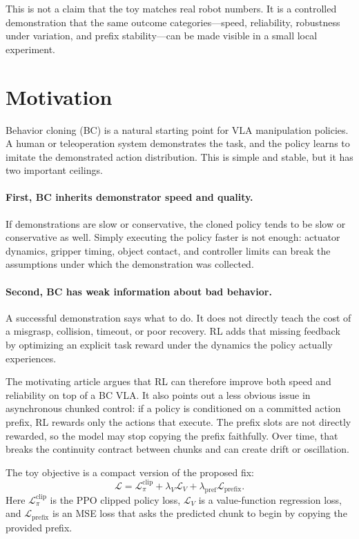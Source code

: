 \documentclass[11pt]{article}
\begin{document}
This is not a claim that the toy matches real robot numbers. It is a controlled demonstration that the same outcome categories---speed, reliability, robustness under variation, and prefix stability---can be made visible in a small local experiment.

\section{Motivation}

Behavior cloning (BC) is a natural starting point for VLA manipulation policies. A human or teleoperation system demonstrates the task, and the policy learns to imitate the demonstrated action distribution. This is simple and stable, but it has two important ceilings.

\paragraph{First, BC inherits demonstrator speed and quality.}
If demonstrations are slow or conservative, the cloned policy tends to be slow or conservative as well. Simply executing the policy faster is not enough: actuator dynamics, gripper timing, object contact, and controller limits can break the assumptions under which the demonstration was collected.

\paragraph{Second, BC has weak information about bad behavior.}
A successful demonstration says what to do. It does not directly teach the cost of a misgrasp, collision, timeout, or poor recovery. RL adds that missing feedback by optimizing an explicit task reward under the dynamics the policy actually experiences.

The motivating article argues that RL can therefore improve both speed and reliability on top of a BC VLA. It also points out a less obvious issue in asynchronous chunked control: if a policy is conditioned on a committed action prefix, RL rewards only the actions that execute. The prefix slots are not directly rewarded, so the model may stop copying the prefix faithfully. Over time, that breaks the continuity contract between chunks and can create drift or oscillation.

The toy objective is a compact version of the proposed fix:
\[
\mathcal{L}
= \mathcal{L}^{\text{clip}}_{\pi}
+ \lambda_V \mathcal{L}_V
+ \lambda_{\text{pref}} \mathcal{L}_{\text{prefix}}.
\]
Here \(\mathcal{L}^{\text{clip}}_{\pi}\) is the PPO clipped policy loss, \(\mathcal{L}_V\) is a value-function regression loss, and \(\mathcal{L}_{\text{prefix}}\) is an MSE loss that asks the predicted chunk to begin by copying the provided prefix.
\end{document}
